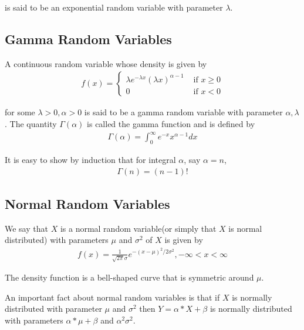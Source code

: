 \documentclass[10 pt,final]{article}
\newcommand{\impo}[1]{{\color{magenta} #1}}
\newcommand{\question}[1]{{\color{blue} #1}}
\begin{document}
is said to be an \impo{exponential random variable} with parameter $\lambda$.

\subsection{Gamma Random Variables}
A continuous random variable whose density is given by
\begin{align*}
f(x) = 
\begin{cases}
\lambda e^{-\lambda x} (\lambda x)^{\alpha-1} & \mbox{ if } x \ge 0 \\
0 & \mbox{ if } x<0
\end{cases}
\end{align*}

for some $\lambda > 0, \alpha >0$ is said to be a \impo{gamma random variable} with parameter $\alpha, \lambda$. The quantity $\Gamma(\alpha)$ is called the gamma function and is defined by 
\begin{align*}
\Gamma(\alpha) = \int_0^{\infty} e^{-x} x^{\alpha-1} dx
\end{align*}

\question{It is easy to show by induction that for integral $\alpha$, say $\alpha = n$,} 
\begin{align*}
\Gamma(n) = (n-1)!
\end{align*}

\subsection{Normal Random Variables}
We say that $X$ is a \impo{normal random variable}(or simply that $X$ is \impo{normal distributed}) with parameters $\mu$ and $\sigma^2$ of $X$ is given by
\begin{align*}
f(x) = \frac{1}{\sqrt{2 \pi} \sigma} e^{-(x-\mu)^2/2 \sigma^2}, -\infty < x < \infty
\end{align*}

The density function is a \impo{bell-shaped} curve that is \impo{symmetric} around $\mu$.

An important fact about normal random variables is that if $X$ is normally distributed with parameter $\mu$ and $\sigma^2$ then $Y = \alpha *X + \beta$ is normally distributed with parameters $\alpha*\mu + \beta$ and \impo{$\alpha^2 \sigma^2$}. 
\end{document}

